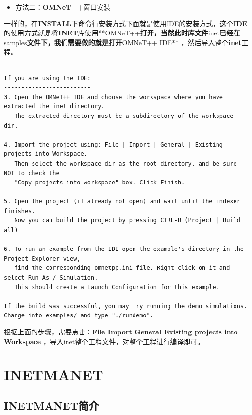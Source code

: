 \begin{itemize}
\item 方法二：\textbf{OMNeT++}窗口安装

\end{itemize}

一样的，在\textbf{INSTALL}下命令行安装方式下面就是使用IDE的安装方式，这个\textbf{IDE}的使用方式就是将\textbf{INET}库使用**OMNeT++\textbf{打开，当然此时库文件}inet\textbf{已经在}samples\textbf{文件下，我们需要做的就是打开}OMNeT++ IDE** ，然后导入整个\textbf{inet}工程。

\begin{verbatim}

If you are using the IDE:
-------------------------
3. Open the OMNeT++ IDE and choose the workspace where you have extracted the inet directory.
   The extracted directory must be a subdirectory of the workspace dir.

4. Import the project using: File | Import | General | Existing projects into Workspace.
   Then select the workspace dir as the root directory, and be sure NOT to check the
   "Copy projects into workspace" box. Click Finish.

5. Open the project (if already not open) and wait until the indexer finishes.
   Now you can build the project by pressing CTRL-B (Project | Build all)

6. To run an example from the IDE open the example's directory in the Project Explorer view,
   find the corresponding omnetpp.ini file. Right click on it and select Run As / Simulation.
   This should create a Launch Configuration for this example.

If the build was successful, you may try running the demo simulations.
Change into examples/ and type "./rundemo".

\end{verbatim}

根据上面的步骤，需要点击：\textbf{File \textbar{} Import \textbar{} General \textbar{} Existing projects into Workspace} ，导入inet整个工程文件，对整个工程进行编译即可。

\section{INETMANET}
\label{inetmanet}

\subsection{INETMANET简介}
\label{inetmanet简介}

